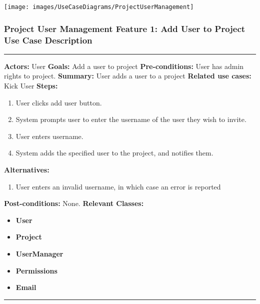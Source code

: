 \documentclass[twoside,letterpaper]{article}
\begin{document}
\texttt{[image: images/UseCaseDiagrams/ProjectUserManagement]}

\newpage

\subsubsection[Project User Management Feature 1: Add User to Project Use Case Description]{\rmfamily\bfseries\color{black}
	Project User Management Feature 1: Add User to Project Use Case Description}
\hypertarget{RefHeading22059017292}{}

\vspace{2pt}
\hrule
\vspace{8pt}
 \textbf{Actors:} User \newline
\textbf{Goals:} Add a user to project \newline
 \textbf{Pre-conditions:} User has admin rights to project. \newline
 \textbf{Summary:} User adds a user to a project \newline
\textbf{Related use cases:} Kick User \newline
\textbf{Steps:} \begin{enumerate}
  \item User clicks add user button.
  \item System prompts user to enter the username of the user they wish to invite.
  \item User enters username.
  \item System adds the specified user to the project, and notifies them.
 \end{enumerate}
 \textbf{Alternatives:} \begin{enumerate}
  \item User enters an invalid username, in which case an error is reported
 \end{enumerate}
 \textbf{Post-conditions:} None. \newline
\vspace{8pt}
\textbf{Relevant Classes:}
\begin{itemize}
	\item \textbf{User}
	\item \textbf{Project}
	\item \textbf{UserManager}
	\item \textbf{Permissions}
	\item \textbf{Email}
\end{itemize}
\hrule
\newpage
\end{document}
